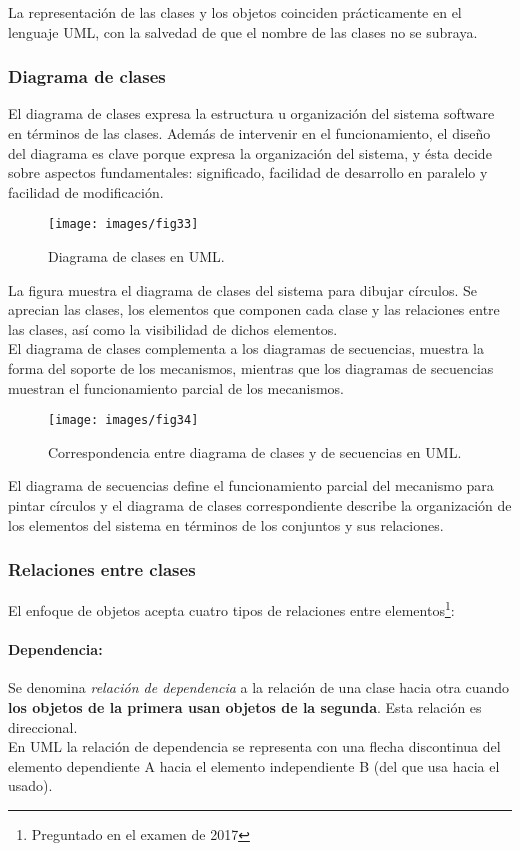 La representación de las clases y los objetos coinciden prácticamente
en el lenguaje UML, con la salvedad de que el nombre de las clases no
se subraya.

\subsubsection{Diagrama de clases}
El diagrama de clases expresa la estructura u organización del sistema
software en términos de las clases. Además de intervenir en el
funcionamiento, el diseño del diagrama es clave porque expresa la
organización del sistema, y ésta decide sobre aspectos fundamentales:
significado, facilidad de desarrollo en paralelo y facilidad de modificación.

\begin{figure}[ht!]  \centering
  \texttt{[image: images/fig33]}
  \caption{Diagrama de clases en UML.}
  \label{fig:33}
\end{figure}

La figura muestra el diagrama de clases del sistema para dibujar
círculos. Se aprecian las clases, los elementos que componen cada
clase y las relaciones entre las clases, así como la visibilidad de
dichos elementos.\\
El diagrama de clases complementa a los diagramas de secuencias,
muestra la forma del soporte de los mecanismos, mientras que los
diagramas de secuencias muestran el funcionamiento parcial de los
mecanismos.
\begin{figure}[ht!]  \centering
  \texttt{[image: images/fig34]}
  \caption{Correspondencia entre diagrama de clases y de secuencias en UML.}
  \label{fig:34}
\end{figure}

El diagrama de secuencias define el funcionamiento parcial del
mecanismo para pintar círculos y el diagrama de clases correspondiente
describe la organización de los elementos del sistema en términos de
los conjuntos y sus relaciones.

\subsubsection{Relaciones entre clases}
El enfoque de objetos acepta cuatro tipos de relaciones entre
elementos\footnote{Preguntado en el examen de 2017}:
\paragraph{Dependencia:}
Se denomina \emph{relación de dependencia} a la relación de una clase
hacia otra cuando \textbf{los objetos de la primera usan objetos de la
  segunda}. Esta relación es direccional. \\
En UML la relación de dependencia se representa con una flecha
discontinua del elemento dependiente A hacia el elemento independiente
B (del que usa hacia el usado).
